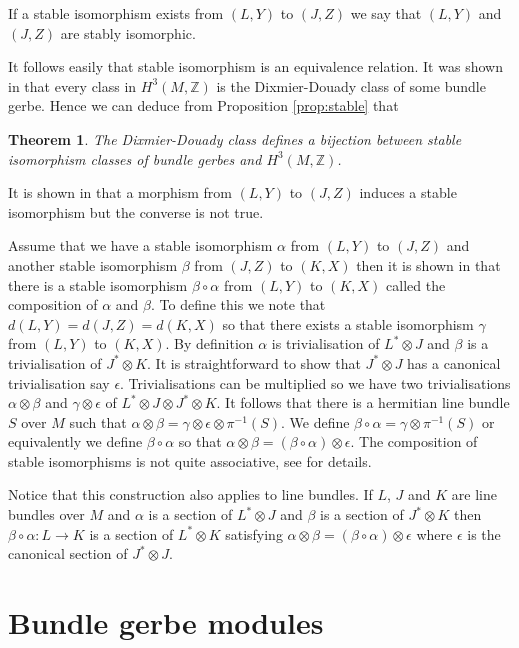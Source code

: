 \documentclass[a4paper,reqno]{amsart}
\theoremstyle{plain}
\newtheorem{theorem}{Theorem}[section]
\theoremstyle{definition}
\theoremstyle{remark}
\numberwithin{equation}{section}
\numberwithin{figure}{section}
\newcommand{\ZZ}{{\mathbb Z}}
\newcommand{\<}{\langle}
\renewcommand{\>}{\rangle}
\begin{document}
If a stable isomorphism exists from $(L, Y)$ to $(J, Z)$
we say that $(L, Y)$ and $(J, Z)$ are stably isomorphic.

It follows easily that  stable
isomorphism is an equivalence relation.
It was shown in \cite{Mur} that every class in $H^3(M, \ZZ)$ is
the Dixmier-Douady class of some bundle gerbe. Hence we can deduce
from Proposition \ref{prop:stable} that
\begin{theorem}
\label{th:stableiso}
The Dixmier-Douady class defines a bijection between
stable isomorphism classes of  bundle gerbes and $H^3(M, \ZZ)$.
\end{theorem}

It is shown in \cite{MurSte} that a morphism from  $(L, Y)$ to $(J, Z)$
induces a stable isomorphism but the converse is not true.

Assume that we have a stable isomorphism $\alpha$ from  $(L, Y)$
to $(J, Z)$
and another stable isomorphism $\beta$ from $(J, Z)$ to $(K, X)$ then
it is shown
in \cite{Ste} that there is a stable isomorphism $\beta\circ \alpha$
from $(L, Y)$ to $(K, X)$ called the composition of $\alpha$ and $\beta$.
To define this we note that $d(L, Y) = d(J, Z) = d(K, X)$ so that
there exists a stable isomorphism $\gamma $ from $(L, Y)$ to $(K,
X)$. By definition
$\alpha$ is trivialisation of $L^*\otimes J$ and $\beta$ is a trivialisation
of $J^* \otimes K$. It is straightforward to show \cite{MurSte} that
$J^* \otimes J$  has
a canonical trivialisation say $\epsilon$.  Trivialisations can be
multiplied so we have
two trivialisations $\alpha\otimes \beta $ and $\gamma \otimes
\epsilon$ of $L^* \otimes J
\otimes J^* \otimes K$. It follows that there is a hermitian line bundle
$S$ over $M$ such that
$\alpha\otimes \beta = \gamma \otimes \epsilon \otimes \pi^{-1}(S)$.  We define
$\beta \circ \alpha = \gamma \otimes \pi^{-1}(S)$ or equivalently we define
$\beta \circ \alpha$ so that $\alpha\otimes \beta = (\beta \circ \alpha)
\otimes \epsilon$.  The composition of stable isomorphisms is not quite
associative, see  \cite{Ste} for details.

Notice that this construction also applies to line bundles. If $L$,
$J$ and $K$ are
line bundles over $M$ and  $\alpha $ is a section
of $L^* \otimes J$ and $\beta$ is a section of $J^* \otimes K$ then
$\beta \circ \alpha
\colon L \to K$ is a section of $L^* \otimes K$ satisfying $\alpha
\otimes \beta =
(\beta\circ \alpha) \otimes \epsilon$ where $\epsilon$ is the
canonical section of
$J^* \otimes J$.

\section{Bundle gerbe modules}
\end{document}
